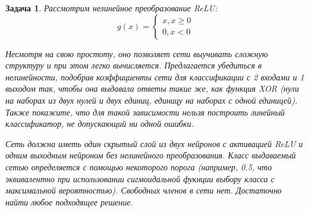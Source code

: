 \documentclass[12pt,fleqn]{article}
\newtheorem{esProblem}{Задача}
\begin{document}
    \begin{esProblem}
        Рассмотрим нелинейное преобразование ReLU: 
        $$g(x) = \begin{cases} x, x \ge 0 \\ 0, x < 0 \end{cases}$$

        Несмотря на свою простоту, оно позволяет сети выучивать сложную структуру и при этом легко вычисляется. Предлагается убедиться в нелинейности, подобрав коэффициенты сети для классификации с 2 входами и 1 выходом так, чтобы она выдавала ответы такие же, как функция XOR (нули на наборах из двух нулей и двух единиц, единицу на наборах с одной единицей). Также покажите, что для такой зависимости нельзя построить линейный классификатор, не допускающий ни одной ошибки.

        Сеть должна иметь один скрытый слой из двух нейронов с активацией ReLU и одним выходным нейроном без нелинейного преобразования. Класс выдаваемый сетью определяется с помощью некоторого порога (например, 0.5, что эквивалентно при использовании сигмоидальной фукнции выбору класса с максимальной вероятностью). Свободных членов в сети нет. Достаточно найти любое подходящее решение.
    \end{esProblem}
\end{document}
